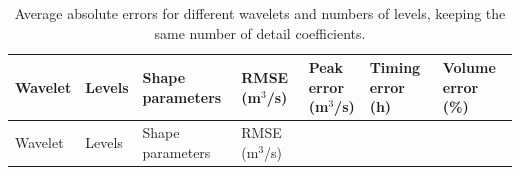 \documentclass[
  11pt,
  a4paper]{article}
\begin{document}
\begin{longtable}[]{@{}
  >{\raggedright\arraybackslash}p{}
  >{\raggedleft\arraybackslash}p{}
  >{\raggedleft\arraybackslash}p{}
  >{\raggedleft\arraybackslash}p{}
  >{\raggedleft\arraybackslash}p{}
  >{\raggedleft\arraybackslash}p{}
  >{\raggedleft\arraybackslash}p{}@{}}
\caption{\label{tab:wavsens}Average absolute errors for different wavelets and numbers of levels, keeping the same number of detail coefficients.}\tabularnewline
\toprule\noalign{}
\begin{minipage}[b]{\linewidth}\raggedright
Wavelet
\end{minipage} & \begin{minipage}[b]{\linewidth}\raggedleft
Levels
\end{minipage} & \begin{minipage}[b]{\linewidth}\raggedleft
Shape parameters
\end{minipage} & \begin{minipage}[b]{\linewidth}\raggedleft
RMSE (m\(^3\)/s)
\end{minipage} & \begin{minipage}[b]{\linewidth}\raggedleft
Peak error (m\(^3\)/s)
\end{minipage} & \begin{minipage}[b]{\linewidth}\raggedleft
Timing error (h)
\end{minipage} & \begin{minipage}[b]{\linewidth}\raggedleft
Volume error (\%)
\end{minipage} \\
\midrule\noalign{}
\endfirsthead
\toprule\noalign{}
\begin{minipage}[b]{\linewidth}\raggedright
Wavelet
\end{minipage} & \begin{minipage}[b]{\linewidth}\raggedleft
Levels
\end{minipage} & \begin{minipage}[b]{\linewidth}\raggedleft
Shape parameters
\end{minipage} & \begin{minipage}[b]{\linewidth}\raggedleft
RMSE (m\(^3\)/s)
\end{minipage} & \begin{minipage}[b]{\linewidth}\raggedleft

\end{minipage}
\end{longtable}
\end{document}
